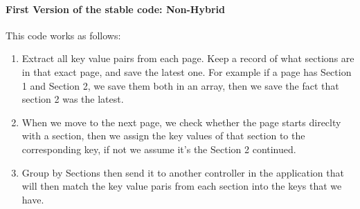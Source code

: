 \documentclass[a4paper,12pt,twoside]{report}
\begin{document}
\paragraph{First Version of the stable code: Non-Hybrid}
This code works as follows: 
\begin{enumerate}
\item Extract all key value pairs from each page. Keep a record of what sections are in that exact page, and save the latest one. For example if a page has Section 1 and Section 2, we save them both in an array, then we save the fact that section 2 was the latest. 
\item When we move to the next page, we check whether the page starts direclty with a section, then we assign the key values of that section to the corresponding key, if not we assume it's the Section 2 continued.
\item Group by Sections then send it to another controller in the application that will then match the key value paris from each section into the keys that we have.
\end{enumerate}
\end{document}

